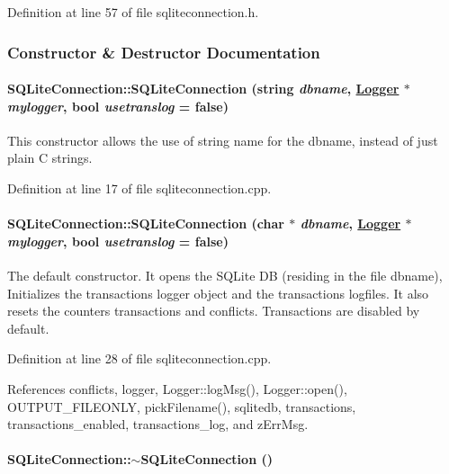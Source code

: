 Definition at line 57 of file sqliteconnection.h.

\subsubsection{Constructor \& Destructor Documentation}
\hypertarget{classSQLiteConnection_SQLiteConnectiona0}{
\paragraph[SQLiteConnection]{\setlength{\rightskip}{0pt plus 5cm}SQLite\-Connection::SQLite\-Connection (string {\em dbname}, \hyperlink{classLogger}{Logger} $\ast$ {\em mylogger}, bool {\em usetranslog} = false)}\hfill}
\label{classSQLiteConnection_SQLiteConnectiona0}


This constructor allows the use of string name for the dbname, instead of just plain C strings. 

Definition at line 17 of file sqliteconnection.cpp.\hypertarget{classSQLiteConnection_SQLiteConnectiona1}{
\paragraph[SQLiteConnection]{\setlength{\rightskip}{0pt plus 5cm}SQLite\-Connection::SQLite\-Connection (char $\ast$ {\em dbname}, \hyperlink{classLogger}{Logger} $\ast$ {\em mylogger}, bool {\em usetranslog} = false)}\hfill}
\label{classSQLiteConnection_SQLiteConnectiona1}


The default constructor. It opens the SQLite DB (residing in the file dbname), Initializes the transactions logger object and the transactions logfiles. It also resets the counters transactions and conflicts. Transactions are disabled by default. 

Definition at line 28 of file sqliteconnection.cpp.

References conflicts, logger, Logger::log\-Msg(), Logger::open(), OUTPUT\_\-FILEONLY, pick\-Filename(), sqlitedb, transactions, transactions\_\-enabled, transactions\_\-log, and z\-Err\-Msg.\hypertarget{classSQLiteConnection_SQLiteConnectiona2}{
\paragraph[$\sim$SQLiteConnection]{\setlength{\rightskip}{0pt plus 5cm}SQLite\-Connection::$\sim$SQLite\-Connection ()}\hfill}
\label{classSQLiteConnection_SQLiteConnectiona2}



